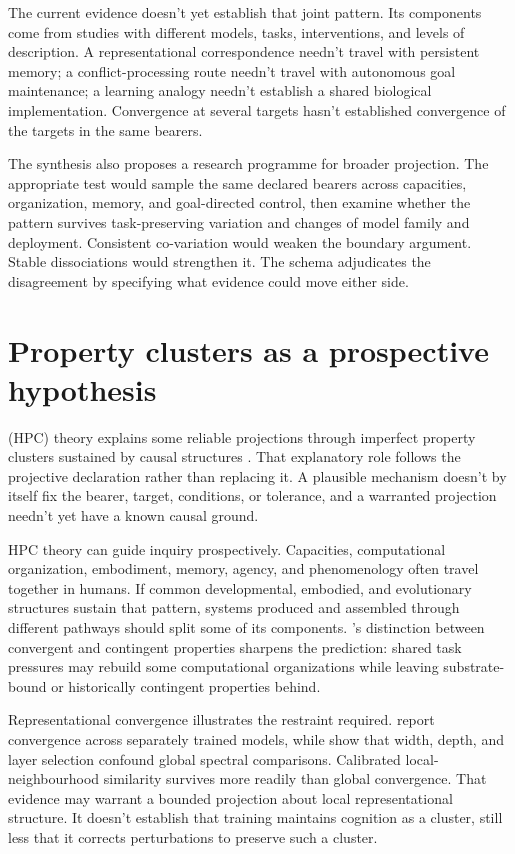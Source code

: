 \documentclass[12pt]{article}
\begin{document}
The current evidence doesn't yet establish that joint pattern. Its components come from studies with different models, tasks, interventions, and levels of description. A representational correspondence needn't travel with persistent memory; a conflict-processing route needn't travel with autonomous goal maintenance; a learning analogy needn't establish a shared biological implementation. Convergence at several targets hasn't established convergence of the targets in the same bearers.

The synthesis also proposes a research programme for broader projection. The appropriate test would sample the same declared bearers across capacities, organization, memory, and goal-directed control, then examine whether the pattern survives task-preserving variation and changes of model family and deployment. Consistent co-variation would weaken the boundary argument. Stable dissociations would strengthen it. The schema adjudicates the disagreement by specifying what evidence could move either side.

\section{Property clusters as a prospective hypothesis}

 (HPC) theory explains some reliable projections through imperfect property clusters sustained by causal structures \citep{boyd1991,boyd1999}. That explanatory role follows the projective declaration rather than replacing it. A plausible mechanism doesn't by itself fix the bearer, target, conditions, or tolerance, and a warranted projection needn't yet have a known causal ground.

HPC theory can guide inquiry prospectively. Capacities, computational organization, embodiment, memory, agency, and phenomenology often travel together in humans. If common developmental, embodied, and evolutionary structures sustain that pattern, systems produced and assembled through different pathways should split some of its components. \textcite{powell2020}'s distinction between convergent and contingent properties sharpens the prediction: shared task pressures may rebuild some computational organizations while leaving substrate-bound or historically contingent properties behind.

Representational convergence illustrates the restraint required. \textcite{huh2024} report convergence across separately trained models, while \textcite{groger2026} show that width, depth, and layer selection confound global spectral comparisons. Calibrated local-neighbourhood similarity survives more readily than global convergence. That evidence may warrant a bounded projection about local representational structure. It doesn't establish that training maintains cognition as a cluster, still less that it corrects perturbations to preserve such a cluster.
\end{document}
